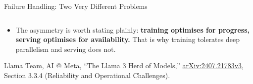\begin{frame}{Failure Handling: Two Very Different Problems}
\begin{columns}[T,onlytextwidth]
  \end{columns}
  \vspace{0.12em}
  \begin{itemize}\scriptsize
    \item[\textcolor{red}{$\blacktriangleright$}] The asymmetry is worth stating plainly: \textbf{training optimises for progress, serving optimises for availability.} That is why training tolerates deep parallelism and serving does not.
  \end{itemize}
  \vspace{0.03em}
  {\scriptsize Llama Team, AI @ Meta, ``The Llama 3 Herd of Models,'' \href{https://arxiv.org/abs/2407.21783v3}{arXiv:2407.21783v3}, Section 3.3.4 (Reliability and Operational Challenges).}
\end{frame}
